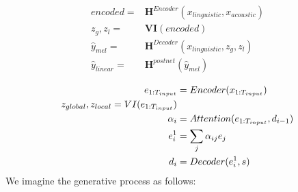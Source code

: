 
\begin{equation} \label{eq1}
\begin{split}
encoded ={}& \textbf{H}^{Encoder}(x_{linguistic}, x_{acoustic}) \\
z_{g}, z_{l} ={}& \textbf{VI}(encoded) \\
\hat{y}_{mel} ={}& \textbf{H}^{Decoder}(x_{linguistic},z_{g}, z_{l}) \\
\hat{y}_{linear} ={}& \textbf{H}^{postnet}(\hat{y}_{mel})
\end{split}
\end{equation}

\iffalse
\begin{equation} \label{eq1}
\centering
\begin{split}
e_{1:T_{input}} & = Encoder(x_{1:T_{input}}) \\
z_{global}, z_{local} = VI(e_{1:T_{input}}) \\
\alpha_{i} & = Attention( e_{1:T_{input}}, d_{i-1}) \\
e^1_i &= \sum_j \alpha_{ij} e_j \\
d_i &= Decoder(e^1_i, s)
\end{split}
\end{equation}
We imagine the generative process as follows:

